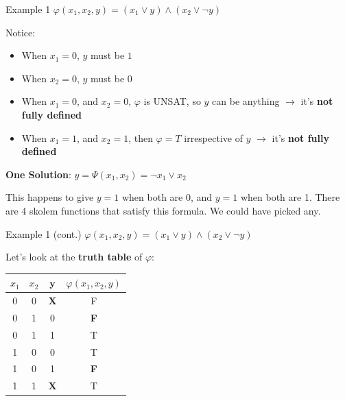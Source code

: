 \documentclass[aspectratio=169]{beamer}
\begin{document}
\begin{frame}{Example 1}
$\varphi(x_1, x_2, y) = (x_1 \lor y) \land (x_2 \lor \neg y)$
\bigskip

Notice:
\begin{itemize}
    \item When $x_1 = 0$, $y$ must be $1$
    \item When $x_2 = 0$, $y$ must be $0$
    \item When $x_1 = 0$, and $x_2 = 0$, $\varphi$ is UNSAT, so $y$ can be anything $\rightarrow$ it's \textbf{not fully defined}
    \item When $x_1 = 1$, and $x_2 = 1$, then $\varphi = T$ irrespective of $y$ $\rightarrow$ it's \textbf{not fully defined}
\end{itemize}
\bigskip

\textbf{One Solution}: $y = \Psi(x_1, x_2) = \neg x_1 \lor x_2$
\bigskip

This happens to give $y=1$ when both are 0, and $y=1$ when both are 1. There
are 4 skolem functions that satisfy this formula. We could have picked
any.
\end{frame}

\begin{frame}{Example 1 (cont.)}
$\varphi(x_1, x_2, y) = (x_1 \lor y) \land (x_2 \lor \neg y)$
\bigskip

Let's look at the \textbf{truth table} of \(\varphi\):

\begin{tabular}{|c|c|c|c|}
    \hline
    $x_1$ & $x_2$ & $\mathbf{y}$ & $\varphi(x_1, x_2, y)$ \\
    \hline
    0 & 0 & \textbf{X} & F\\
    0 & 1 & 0 & \textbf{F}\\
    0 & 1 & 1 & T\\
    1 & 0 & 0 & T\\
    1 & 0 & 1 & \textbf{F}\\
    1 & 1 & \textbf{X} & T\\
    \hline
\end{tabular}
\end{frame}
\end{document}
